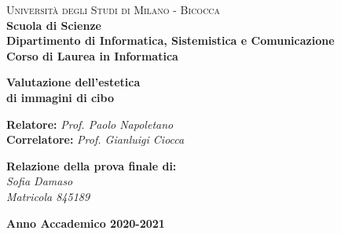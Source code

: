 \begin{titlepage}
        
        \noindent
        \begin{minipage}[t]{0.19\textwidth}
        \end{minipage}
        \begin{minipage}[t]{0.81\textwidth}
        {
                {\textsc{Università degli Studi di Milano - Bicocca}} \\
                \textbf{Scuola di Scienze} \\
                \textbf{Dipartimento di Informatica, Sistemistica e Comunicazione} \\
                \textbf{Corso di Laurea in Informatica} \\
                \par
        }
        \end{minipage}
        
	\vspace{40mm}
  
  \begin{center}
     {\Huge{
            \textbf{Valutazione dell’estetica \\di immagini di cibo}
            \par
            }}
  \end{center}
  
  \vspace{40mm}

  \noindent
  {\large \textbf{Relatore:} \textit{Prof. Paolo Napoletano} } \\
  
  \noindent
  {\large \textbf{Correlatore:} \textit{Prof. Gianluigi Ciocca}}
  
  \vspace{15mm}

  \begin{flushright}
  
    \textbf{\large Relazione della prova finale di:} \\
    \large{\textit{Sofia Damaso}}\\
    \large{\textit{Matricola 845189}}
  \end{flushright}
  
  \vspace{40mm}
  \begin{center}
    {\large{\bf Anno Accademico 2020-2021}}
  \end{center}
  
\end{titlepage}
\restoregeometry